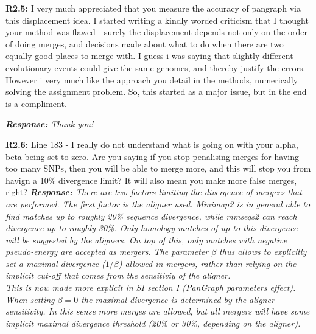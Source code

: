 \documentclass[aps,rmp,onecolumn]{revtex4-1}
\newcommand{\Marco}[1]{{\color{orange}Marco: #1}}
\newcommand{\Liam}[1]{{\color{teal}Liam: #1}}
\newcommand{\reviewer}[2]{\textbf{#1:} #2\vskip 5mm}
\newcommand{\response}[1]{{\it {\color{response}\textbf{Response:} #1}}\vskip 5mm}
\begin{document}
\reviewer{R2.5}{I very much appreciated that you measure the accuracy of pangraph via this displacement idea. I started writing a kindly worded criticism that I thought your method was flawed - surely the displacement depends not only on the order of doing merges, and decisions made about what to do when there are two equally good places to merge with. I guess i was saying that slightly different evolutionary events could give the same genomes, and thereby justify the errors. However i very much like the approach you detail in the methods, numerically solving the assignment problem. So, this started as a major issue, but in the end is a compliment.}

\response{Thank you!}

\reviewer{R2.6}{Line 183 - I really do not understand what is going on with your alpha, beta being set to zero. Are you saying if you stop penalising merges for having too many SNPs, then you will be able to merge more, and this will stop you from havign a 10\% divergence limit? It will also mean you make more false merges, right?}
\response{There are two factors limiting the divergence of mergers that are performed. The first factor is the aligner used. Minimap2 is in general able to find matches up to roughly 20\% sequence divergence, while mmseqs2 can reach divergence up to roughly 30\%. Only homology matches of up to this divergence will be suggested by the aligners.
      On top of this, only matches with negative pseudo-energy are accepted as mergers.
      The parameter $\beta$ thus allows to explicitly set a maximal divergence ($1/\beta$) allowed in mergers, rather than relying on the implicit cut-off that comes from the sensitiviy of the aligner. \\
      This is now made more explicit in SI section I (PanGraph parameters effect).\\
      When setting $\beta = 0$ the maximal divergence is determined by the aligner sensitivity. In this sense more merges are allowed, but all mergers will have some implicit maximal divergence threshold (20\% or 30\%, depending on the aligner).}
\end{document}

